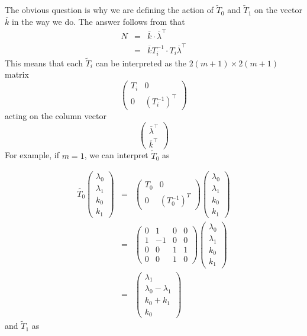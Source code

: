 \documentclass[12pt,oneside,openany]{article}
\begin{document}
The obvious question is why we are defining the action of $\tilde{T}_0$ and $\tilde{T}_1$ on the vector $\overline{k}$ in the way we do.
The answer  follows from that
\begin{eqnarray*}
N &=& \overline{k} \cdot \overline{\lambda}^{\top} \\
&=& \overline{k} T_i^{-1} \cdot T_i  \overline{\lambda}^{\top} 
\end{eqnarray*}
This means that each $\tilde{T}_i$ can be interpreted as the $2(m+1) \times 2(m+1)$ matrix
$$\left(  \begin{array}{cc} T_i & 0 \\ 0 & (T_i^{-1})^{\top} \end{array} \right) $$
acting on the column vector
$$ \left(  \begin{array}{c} \overline{\lambda}^{\top} \\     \overline{k}^{\top} \end{array}  \right) $$
For example, if $m=1$, we can interpret  $\tilde{T}_0$ as


 \begin{eqnarray*}\tilde{T_0} \left( \begin{array}{c} \lambda_0\\ \lambda_1  \\ k_0 \\ k_1 \end{array} \right) &=& \left( \begin{array}{cc} T_0& 0\\0 & (T_0^{-1})^{T} \end{array} \right)   \left( \begin{array}{c} \lambda_0\\  \lambda_1 \\ k_0 \\ k_1\end{array} \right) \\ &=& \left( \begin{array}{cccc} 0& 1&0&0\\1 & -1&0&0 \\ 0&0&1&1\\ 0&0& 1&0 \end{array} \right)   \left( \begin{array}{c} \lambda_0 \\\lambda_1 \\ k_0 \\ k_1\end{array} \right) \\&=&   \left( \begin{array}{c} \lambda_1\\  \lambda_0-\lambda_1 \\ k_0+k_1 \\ k_0 \end{array} \right) 
 \end{eqnarray*}
and $\tilde{T}_1$ as
\end{document}
